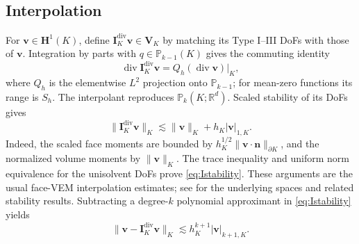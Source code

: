 \documentclass[review,hidelinks,onefignum,onetabnum]{siamart251216}
\newcommand{\AI}[1]{{\color{blue}#1}}
\begin{document}
\subsection{Interpolation}
For $\boldsymbol v\in\boldsymbol H^1(K)$, define
$\boldsymbol I_K^{\operatorname{div}}\boldsymbol v\in\boldsymbol V_K$
by matching its Type I--III DoFs with those of $\boldsymbol v$.
\AI{Integration by parts with $q\in\mathbb P_{k-1}(K)$ gives the commuting identity
\begin{equation}\label{eq:commuting}
\operatorname{div}\boldsymbol I_K^{\operatorname{div}}\boldsymbol v
=Q_h(\operatorname{div}\boldsymbol v)|_K,
\end{equation}
where $Q_h$ is the elementwise $L^2$ projection onto $\mathbb P_{k-1}$;
for mean-zero functions its range is $S_h$.
The interpolant reproduces $\mathbb P_k(K;\mathbb R^d)$.
Scaled stability of its DoFs gives
\begin{equation}\label{eq:Istability}
\|\boldsymbol I_K^{\operatorname{div}}\boldsymbol v\|_K
\lesssim\|\boldsymbol v\|_K+h_K|\boldsymbol v|_{1,K}.
\end{equation}
Indeed, the scaled face moments are bounded by
$h_K^{1/2}\|\boldsymbol v\cdot\boldsymbol n\|_{\partial K}$,
and the normalized volume moments by $\|\boldsymbol v\|_K$.
The trace inequality and uniform norm equivalence for the unisolvent DoFs
prove \eqref{eq:Istability}. These arguments are the usual face-VEM
interpolation estimates; see \cite{BBMR2016,BMM2022} for the underlying
spaces and related stability results. Subtracting a degree-$k$ polynomial
approximant in \eqref{eq:Istability} yields
\begin{equation}\label{eq:Iapprox}
\|\boldsymbol v-\boldsymbol I_K^{\operatorname{div}}\boldsymbol v\|_K
\lesssim h_K^{k+1}|\boldsymbol v|_{k+1,K}.
\end{equation}}
\end{document}
